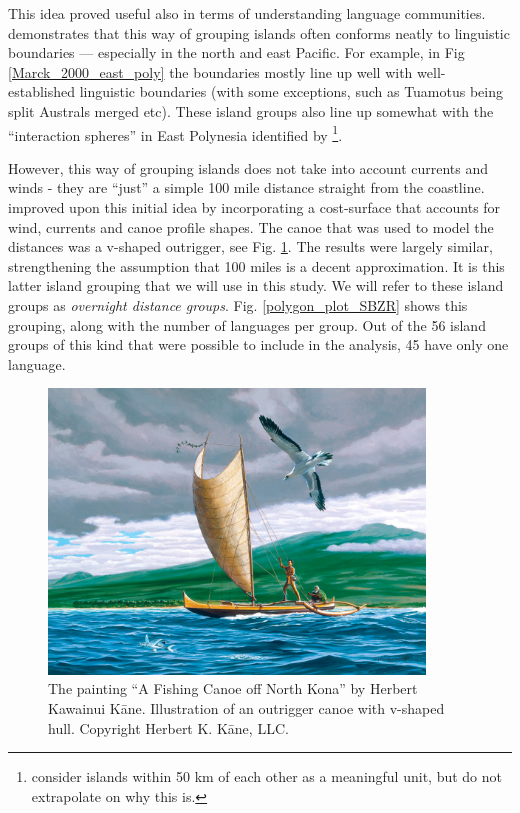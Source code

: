 \documentclass[a4paper,10pt]{article} %
\begin{document}
This idea proved useful also in terms of understanding language communities. \citet{mark_1986, marck2000} demonstrates that this way of grouping islands often conforms neatly to linguistic boundaries --- especially in the north and east Pacific. For example, in Fig  \ref{Marck_2000_east_poly} the boundaries mostly line up well with well-established linguistic boundaries (with some exceptions, such as Tuamotus being split Australs merged etc). These island groups also line up somewhat with the ``interaction spheres'' in East Polynesia identified by \citet{rolett2002voyaging}\footnote{\citet{rolett2004environmental} consider islands within 50 km of each other as a meaningful unit, but do not extrapolate on why this is.}. 

However, this way of grouping islands does not take into account currents and winds - they are ``just'' a simple 100 mile distance straight from the coastline. \citet{NZSA_overnight_2023} improved upon this initial idea by incorporating a cost-surface that accounts for wind, currents and canoe profile shapes. The canoe that was used to model the distances was a v-shaped outrigger, see Fig. \ref{kane_fishing_canoe}. The results were largely similar, strengthening the assumption that 100 miles is a decent approximation. It is this latter island grouping that we will use in this study. We will refer to these island groups as \textit{overnight distance groups}. Fig. \ref{polygon_plot_SBZR} shows this grouping, along with the number of languages per group. Out of the 56 island groups of this kind that were possible to include in the analysis, 45 have only one language.

\begin{figure}[ht]
\centering
\includegraphics[width=10cm]{Herb-Kane_Fishing-Canoe-off-North-Kona.jpg}
\caption{{The painting ``A Fishing Canoe off North Kona'' by Herbert Kawainui K{\=a}ne. Illustration of an outrigger canoe with v-shaped hull. Copyright Herbert K. K{\=a}ne, LLC.}}
\label{kane_fishing_canoe}
\end{figure}
\end{document}

